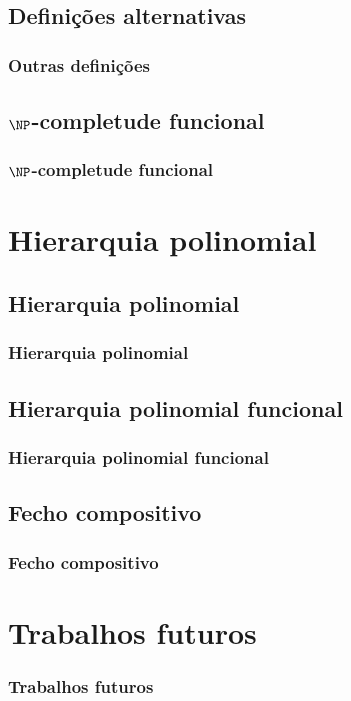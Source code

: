\documentclass[utf8,notheorems]{beamer}
\theoremstyle{definition}
\begin{document}
\subsection{Definições alternativas}
\begin{frame}
    \frametitle{Outras definições}
\end{frame}

\subsection{$\NP$-completude funcional}
\begin{frame}
    \frametitle{$\NP$-completude funcional}
\end{frame}

\section{Hierarquia polinomial}

\subsection{Hierarquia polinomial}
\begin{frame}
    \frametitle{Hierarquia polinomial}
\end{frame}

\subsection{Hierarquia polinomial funcional}
\begin{frame}
    \frametitle{Hierarquia polinomial funcional}
\end{frame}

\subsection{Fecho compositivo}
\begin{frame}
    \frametitle{Fecho compositivo}
\end{frame}

\section{Trabalhos futuros}
\begin{frame}
    \frametitle{Trabalhos futuros}
\end{frame}
\end{document}
